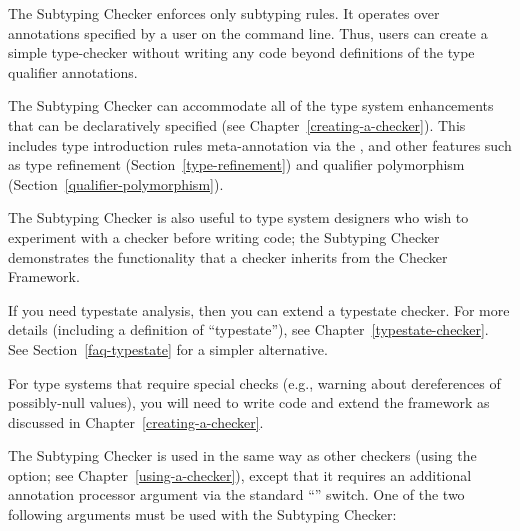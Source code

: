 \htmlhr
{}

The Subtyping Checker enforces only subtyping rules.  It operates over
annotations specified by a user on the command line.  Thus, users can
create a simple type-checker without writing any code beyond definitions of
the type qualifier annotations.

The Subtyping Checker can accommodate all of the type system enhancements that
can be declaratively specified (see Chapter~\ref{creating-a-checker}).
This includes type introduction rules meta-annotation via the
, and other features such as
type refinement (Section~\ref{type-refinement}) and
qualifier polymorphism (Section~\ref{qualifier-polymorphism}).

The Subtyping Checker is also useful to type system designers who wish to
experiment with a checker before writing code; the Subtyping Checker
demonstrates the functionality that a checker inherits from the Checker
Framework.

If you need typestate analysis, then you can extend a typestate checker.
For more details (including a definition of ``typestate''), see
Chapter~\ref{typestate-checker}.
See Section~\ref{faq-typestate} for a simpler alternative.

For type systems that require special checks (e.g., warning about
dereferences of possibly-null values), you will need to write code and
extend the framework as discussed in Chapter~\ref{creating-a-checker}.



\begin{sloppypar}
The Subtyping Checker is used in the same way as other checkers (using the
 option; see Chapter~\ref{using-a-checker}), except that it
requires an additional annotation processor argument via the standard
``'' switch. One of the two following arguments must be used with the
Subtyping Checker:
\end{sloppypar}

